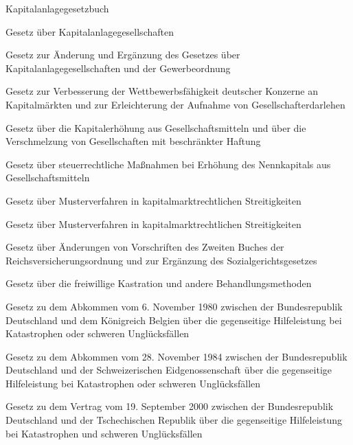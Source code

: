 \item[{KAGB}] Kapitalanlagegesetzbuch

\item[{KAGG}] Gesetz über Kapitalanlagegesellschaften

\item[{KAGG-GewOErgG}] Gesetz zur Änderung und Ergänzung des Gesetzes über Kapitalanlagegesellschaften und der Gewerbeordnung

\item[{KapAEG}] Gesetz zur Verbesserung der Wettbewerbsfähigkeit deutscher Konzerne an Kapitalmärkten und zur Erleichterung der Aufnahme von Gesellschafterdarlehen

\item[{KapErhG}] Gesetz über die Kapitalerhöhung aus Gesellschaftsmitteln und über die Verschmelzung von Gesellschaften mit beschränkter Haftung

\item[{KapErhStG}] Gesetz über steuerrechtliche Maßnahmen bei Erhöhung des Nennkapitals aus Gesellschaftsmitteln

\item[{KapMuG}] Gesetz über Musterverfahren in kapitalmarktrechtlichen Streitigkeiten

\item[{KapMuG-2012}] Gesetz über Musterverfahren in kapitalmarktrechtlichen Streitigkeiten

\item[{KARG}] Gesetz über Änderungen von Vorschriften des Zweiten Buches der Reichsversicherungsordnung und zur Ergänzung des Sozialgerichtsgesetzes

\item[{KastrG}] Gesetz über die freiwillige Kastration und andere Behandlungsmethoden

\item[{KatHiLAbkBELG}] Gesetz zu dem Abkommen vom 6. November 1980 zwischen der Bundesrepublik Deutschland und dem Königreich Belgien über die gegenseitige Hilfeleistung bei Katastrophen oder schweren Unglücksfällen

\item[{KatHiLAbkCHEG}] Gesetz zu dem Abkommen vom 28. November 1984 zwischen der Bundesrepublik Deutschland und der Schweizerischen Eidgenossenschaft über die gegenseitige Hilfeleistung bei Katastrophen oder schweren Unglücksfällen

\item[{KatHiLAbkCZEG}] Gesetz zu dem Vertrag vom 19. September 2000 zwischen der Bundesrepublik Deutschland und der Tschechischen Republik über die gegenseitige Hilfeleistung bei Katastrophen und schweren Unglücksfällen

